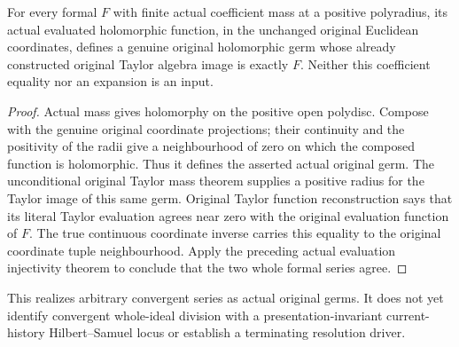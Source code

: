 \begin{theorem}
\label{hir:actual-convergent-original-taylor-realization}
\leanok
For every formal $F$ with finite actual coefficient mass at a positive
polyradius, its actual evaluated holomorphic function, in the unchanged
original Euclidean coordinates, defines a genuine original holomorphic
germ whose already constructed original Taylor algebra image is exactly
$F$. Neither this coefficient equality nor an expansion is an input.
\end{theorem}
\begin{proof}
Actual mass gives holomorphy on the positive open polydisc. Compose with
the genuine original coordinate projections; their continuity and the
positivity of the radii give a neighbourhood of zero on which the composed
function is holomorphic. Thus it defines the asserted actual original
germ. The unconditional original Taylor mass theorem supplies a positive
radius for the Taylor image of this same germ. Original Taylor function
reconstruction says that its literal Taylor evaluation agrees near zero
with the original evaluation function of $F$. The true continuous
coordinate inverse carries this equality to the original coordinate tuple
neighbourhood. Apply the preceding actual evaluation injectivity theorem
to conclude that the two whole formal series agree.
\end{proof}

This realizes arbitrary convergent series as actual original germs. It does
not yet identify convergent whole-ideal division with a presentation-invariant
current-history Hilbert--Samuel locus or establish a terminating resolution
driver.
